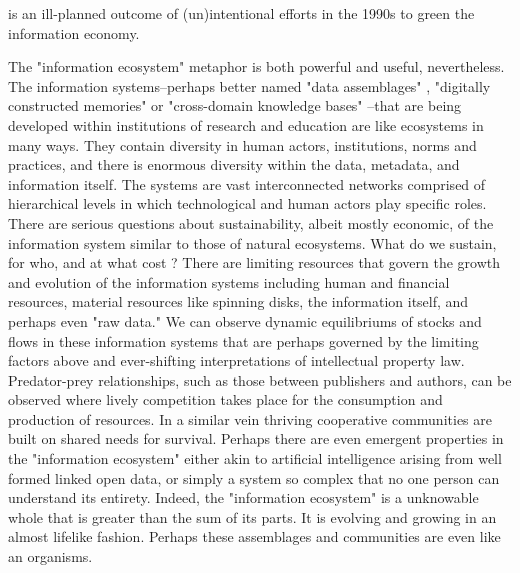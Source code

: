 is an ill-planned outcome of (un)intentional efforts in the 1990s to green the information economy.

The "information ecosystem" metaphor is both powerful and useful, nevertheless. The information systems--perhaps better named "data assemblages" \citep{kitchin_2014}, "digitally constructed memories" or "cross-domain knowledge bases" \citep{baker_2007}--that are being developed within institutions of research and education are like ecosystems in many ways. They contain diversity in human actors, institutions, norms and practices, and there is enormous diversity within the data, metadata, and information itself. The systems are vast interconnected networks comprised of hierarchical levels in which technological and human actors play specific roles. There are serious questions about sustainability, albeit mostly economic, of the information system similar to those of natural ecosystems. What do we sustain, for who, and at what cost \citep[cf.][especially ch. 10]{merenlender_2004,liverman_2004,kitchin_2014}? There are limiting resources that govern the growth and evolution of the information systems including human and financial resources, material resources like spinning disks, the information itself, and perhaps even "raw data." We can observe dynamic equilibriums of stocks and flows in these information systems that are perhaps governed by the limiting factors above and ever-shifting interpretations of intellectual property law. Predator-prey relationships, such as those between publishers and authors, can be observed where lively competition takes place for the consumption and production of resources. In a similar vein thriving cooperative communities are built on shared needs for survival. Perhaps there are even emergent properties in the "information ecosystem" either akin to artificial intelligence arising from well formed linked open data, or simply a system so complex that no one person can understand its entirety. Indeed, the "information ecosystem" is a unknowable whole that is greater than the sum of its parts. It is evolving and growing in an almost lifelike fashion. Perhaps these assemblages and communities are even like an organisms.

